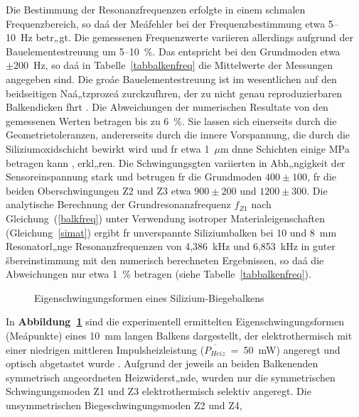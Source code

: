 Die Bestimmung der Resonanzfrequenzen erfolgte in einem
schmalen Frequenzbereich, so daá der Meáfehler bei der Frequenzbestimmung
etwa 5--10~Hz betr„gt. Die gemessenen Frequenzwerte variieren
allerdings aufgrund der Bauelementestreuung um 5--10~\%. Das entspricht
bei den Grundmoden etwa $\pm200$~Hz, so daá
in Tabelle~\ref{tabbalkenfreq} die Mittelwerte der Messungen angegeben sind.
Die groáe Bauelementestreuung ist im wesentlichen auf den beidseitigen
Naá„tzprozeá zurckzufhren, der zu nicht genau reproduzierbaren
Balkendicken fhrt \cite{ABV93}. Die Abweichungen der numerischen
Resultate von den gemessenen Werten betragen bis zu 6~\%. Sie lassen sich
einerseits durch die Geometrietoleranzen, andererseits durch die innere
Vorspannung, die durch die Siliziumoxidschicht bewirkt wird und fr
etwa 1~$\mu$m dnne Schichten einige MPa betragen kann \cite{Mur92},
erkl„ren. Die Schwingungsgten variierten in Abh„ngigkeit der
Sensoreinspannung stark und betrugen fr die Grundmoden $400\pm100$, fr die
beiden Oberschwingungen Z2 und Z3 etwa $900\pm200$ und $1200\pm300$.
Die analytische Berechnung der Grundresonanzfrequenz $f_{Z1}$
nach Gleichung~(\ref{balkfreq}) unter Verwendung isotroper
Materialeigenschaften (Gleichung~\ref{simat}) ergibt fr
unverspannte Siliziumbalken bei 10 und 8~mm Resonatorl„nge
Resonanzfrequenzen von 4,386~kHz und 6,853~kHz in guter šbereinstimmung
mit den numerisch berechneten Ergebnissen, so daá die Abweichungen nur etwa
1~\% betragen (siehe Tabelle~\ref{tabbalkenfreq}).
\begin{figure}[htb]
\begin{center}

\setabbvda
\end{center}
\caption{\label{abbbalkenmoden}
 Eigenschwingungsformen eines Silizium-Biegebalkens}
\end{figure}
In {\bf Abbildung~\ref{abbbalkenmoden}} sind die experimentell ermittelten
Eigenschwingungsformen (Meápunkte) eines 10~mm langen Balkens dargestellt,
der elektrothermisch mit einer niedrigen mittleren Impulsheizleistung
($\overline{P_{Heiz}}$~=~50~mW) angeregt und optisch abgetastet
wurde \cite{Mue92}. Aufgrund der jeweils an beiden Balkenenden symmetrisch
angeordneten Heizwiderst„nde, wurden nur die symmetrischen Schwingungsmoden
Z1 und Z3 elektrothermisch selektiv angeregt. Die unsymmetrischen
Biegeschwingungsmoden Z2 und Z4,
